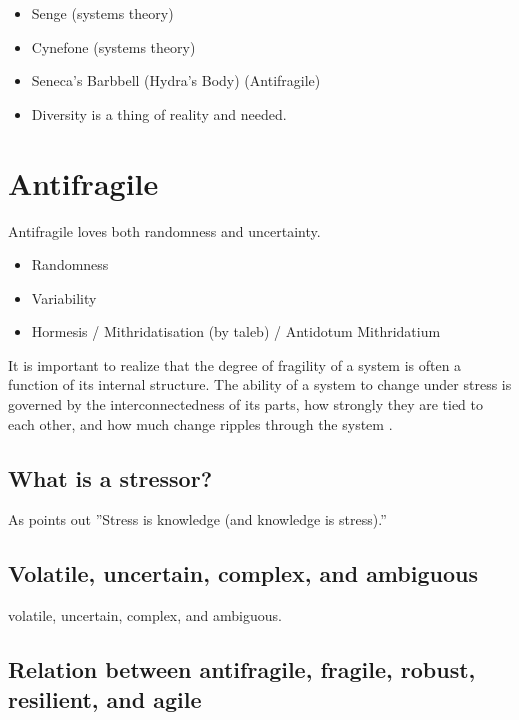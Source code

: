 \begin{itemize}
	\item{Senge (systems theory)}
	\item{Cynefone (systems theory)}
	\item{Seneca's Barbbell (Hydra's Body) (Antifragile)}
	\item{Diversity is a thing of reality and needed.}
\end{itemize}

\section{Antifragile}
\label{sec:tbantifragile}

Antifragile loves both randomness and uncertainty.

\begin{itemize}
	\item{Randomness}
	\item{Variability}
	\item{Hormesis / Mithridatisation (by taleb) / Antidotum Mithridatium}
\end{itemize}

It is important to realize that the degree of \gls{fragility} of a system is often a function of its internal structure. The ability of a system to change under stress is governed by the interconnectedness of its parts, how strongly they are tied to each other, and how much change ripples through the system \parencite[p. 886]{OReilly2019}.\\



\subsection{What is a stressor?}
\label{sub:stressor}
As \textcite[p. 54]{Taleb2012} points out ''Stress is knowledge (and knowledge is stress).''

\subsection{Volatile, uncertain, complex, and ambiguous}
\label{seb:tbvuca}

\Gls{volatile}, \gls{uncertain}, \gls{complex}, and \gls{ambiguous}.

\subsection{Relation between antifragile, fragile, robust, resilient, and agile}
\label{sub:tbrelatedtoantifragile}

